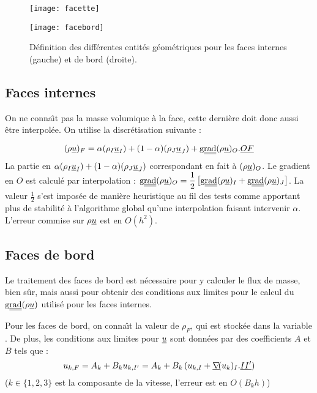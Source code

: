 \begin{figure}[h]
\parbox{8cm}{%
\centerline{\texttt{[image: facette]}}}
\parbox{8cm}{%
\centerline{\texttt{[image: facebord]}}}
\caption{\label{Base_Inimas_fig_geom}D\'efinition des diff\'erentes entit\'es
g\'eom\'etriques pour les faces internes (gauche) et de bord (droite).}
\end{figure}


\subsection*{Faces internes}
On ne conna\^\i t pas la masse volumique \`a la face, cette derni\`ere doit donc
aussi \^etre interpol\'ee. On utilise la discr\'etisation suivante :

\begin{equation}
(\rho \underline{u})_F = \alpha(\rho_I \underline{u}_I)
+(1-\alpha)(\rho_J \underline{u}_J)
+\text{g}\underline{\underline{{\text{rad}}}}\,\!(\rho\underline{u})_O.\underline{OF}
\end{equation}
La partie en $\alpha(\rho_I \underline{u}_I)
+(1-\alpha)(\rho_J \underline{u}_J)$ correspondant en fait \`a
$(\rho\underline{u})_O$. Le gradient en $O$ est calcul\'e par interpolation :
$\displaystyle\text{g}\underline{\underline{{\text{rad}}}}\,\!(\rho\underline{u})_O=
\frac{1}{2}\left[\text{g}\underline{\underline{{\text{rad}}}}\,\!(\rho\underline{u})_I+\text{g}\underline{\underline{{\text{rad}}}}\,\!(\rho\underline{u})_J\right]$. La
valeur $\displaystyle\frac{1}{2}$ s'est impos\'ee de mani\`ere heuristique au
fil des tests
comme apportant plus de stabilit\'e \`a l'algorithme global qu'une interpolation
faisant intervenir $\alpha$. L'erreur commise sur $\rho\underline{u}$ est en
$O(h^2)$.


\subsection*{Faces de bord}
Le traitement des faces de bord est n\'ecessaire pour y calculer le flux de
masse, bien s\^ur, mais aussi pour obtenir des conditions aux limites pour le
calcul du $\text{g}\underline{\underline{{\text{rad}}}}\,\!(\rho \underline{u})$ utilis\'e pour les faces internes.

Pour les faces de bord, on conna\^\i t la valeur de $\rho_F$, qui est stock\'ee
dans la variable . De plus, les conditions aux limites pour $\underline{u}$
sont donn\'ees par des coefficients $A$ et $B$ tels que :
\begin{equation}
u_{k,F} = A_k + B_ku_{k,I^\prime} =
A_k + B_k\left(u_{k,I} + \underline{\nabla}\!(u_k)_I.\underline{II^\prime}\right)
\end{equation}
($k\in\{1,2,3\}$ est la composante de la vitesse, l'erreur est en $O(B_kh)$)

